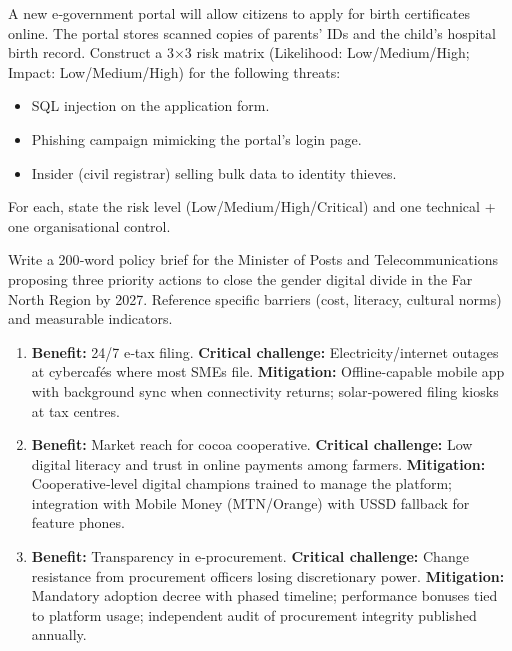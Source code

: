 \documentclass[11pt]{article}
\begin{document}
\begin{exercice}
A new e‑government portal will allow citizens to apply for birth certificates online. The portal stores scanned copies of parents’ IDs and the child’s hospital birth record. Construct a 3$\times$3 risk matrix (Likelihood: Low/Medium/High; Impact: Low/Medium/High) for the following threats:
\begin{itemize}
\item SQL injection on the application form.
\item Phishing campaign mimicking the portal’s login page.
\item Insider (civil registrar) selling bulk data to identity thieves.
\end{itemize}
For each, state the risk level (Low/Medium/High/Critical) and one technical + one organisational control.
\end{exercice}

\begin{exercice}
Write a 200‑word policy brief for the Minister of Posts and Telecommunications proposing three priority actions to close the gender digital divide in the Far North Region by 2027. Reference specific barriers (cost, literacy, cultural norms) and measurable indicators.
\end{exercice}

\begin{corrige}[Exercise 1]
\begin{enumerate}
\item \textbf{Benefit:} 24/7 e‑tax filing. \textbf{Critical challenge:} Electricity/internet outages at cybercafés where most SMEs file. \textbf{Mitigation:} Offline-capable mobile app with background sync when connectivity returns; solar‑powered filing kiosks at tax centres.
\item \textbf{Benefit:} Market reach for cocoa cooperative. \textbf{Critical challenge:} Low digital literacy and trust in online payments among farmers. \textbf{Mitigation:} Cooperative‑level digital champions trained to manage the platform; integration with Mobile Money (MTN/Orange) with USSD fallback for feature phones.
\item \textbf{Benefit:} Transparency in e‑procurement. \textbf{Critical challenge:} Change resistance from procurement officers losing discretionary power. \textbf{Mitigation:} Mandatory adoption decree with phased timeline; performance bonuses tied to platform usage; independent audit of procurement integrity published annually.
\end{enumerate}
\end{corrige}
\end{document}
